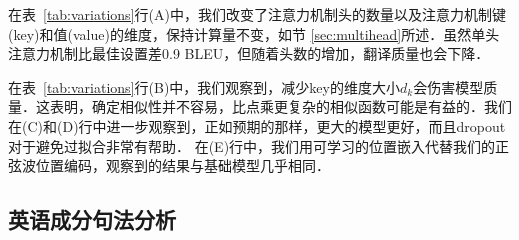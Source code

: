 
在表~\ref{tab:variations}行(A)中，我们改变了注意力机制头的数量以及注意力机制键(key)和值(value)的维度，保持计算量不变，如节 \ref{sec:multihead}所述．虽然单头注意力机制比最佳设置差0.9 BLEU，但随着头数的增加，翻译质量也会下降．


在表~\ref{tab:variations}行(B)中，我们观察到，减少key的维度大小$d_k$会伤害模型质量．这表明，确定相似性并不容易，比点乘更复杂的相似函数可能是有益的．我们在(C)和(D)行中进一步观察到，正如预期的那样，更大的模型更好，而且dropout对于避免过拟合非常有帮助． 在(E)行中，我们用可学习的位置嵌入代替我们的正弦波位置编码\citep{JonasFaceNet2017}，观察到的结果与基础模型几乎相同．




\subsection{英语成分句法分析}

